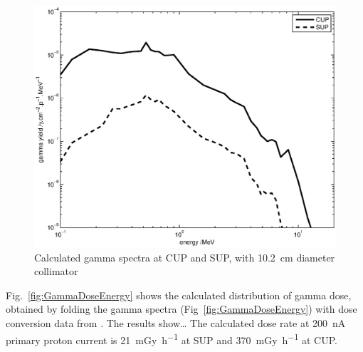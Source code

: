 \documentclass[11pt,a4paper]{IEEEtran}
\let\MYoriglatexcaption\caption
\renewcommand{\caption}[2][\relax]{\MYoriglatexcaption[#2]{#2}}
\begin{document}
\begin{figure}[t]
    \centering
    \includegraphics[width=0.9\columnwidth]{gDYieldcomparedRADECS.eps}
    \caption{
        Calculated gamma spectra at CUP and SUP, with
        \SI{10.2}{\cm} diameter collimator
    }
    \label{fig:DifferentialGammaSpectra}
\end{figure}

Fig.~\ref{fig:GammaDoseEnergy} shows the calculated distribution of gamma dose, obtained by folding the gamma spectra (Fig~\ref{fig:GammaDoseEnergy}) with dose conversion data from \cite{Kwon1980}.
The results show\ldots
{}
The calculated dose rate at \SI{200}{\nA} primary proton current is \SI{21}{\milli\gray\per\hour} at SUP and \SI{370}{\milli\gray\per\hour} at CUP.
\end{document}
